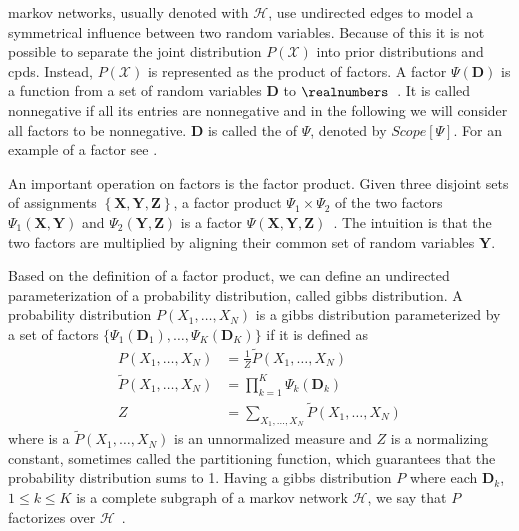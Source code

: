 \bigskip

\Glspl{markov network}, usually denoted with $\mathcal{H}$, use undirected \glspl{edge} to model a symmetrical influence between two \glspl{random variable}.
Because of this it is not possible to separate the \gls{joint distribution} $P(\mathcal{X})$ into \glspl{prior distribution} and \glspl{cpd}.
Instead, $P(\mathcal{X})$ is represented as the product of \glspl{factor}.
A \gls{factor} $\Psi(\mathbf{D})$ is a function from a set of \glspl{random variable} $\mathbf{D}$ to $\realnumbers$~\citep{koller2009probabilistic}.
It is called nonnegative if all its entries are nonnegative and in the following we will consider all factors to be nonnegative.
$\mathbf{D}$ is called the  of $\Psi$, denoted by $Scope[\Psi]$.
For an example of a factor see .

An important operation on factors is the \gls{factor product}.
Given three disjoint sets of assignments $\left\{\mathbf{X}, \mathbf{Y}, \mathbf{Z}\right\}$, a \gls{factor product} $\Psi_1\times \Psi_2$ of the two factors $\Psi_1(\mathbf{X},\mathbf{Y})$ and $\Psi_2(\mathbf{Y},\mathbf{Z})$ is a factor $\Psi(\mathbf{X},\mathbf{Y},\mathbf{Z})$~\citep{koller2009probabilistic}.
The intuition is that the two factors are multiplied by aligning their common set of \glspl{random variable} $\mathbf{Y}$.

Based on the definition of a \gls{factor product}, we can define an undirected parameterization of a \gls{probability distribution}, called \gls{gibbs distribution}.
A \gls{probability distribution} $P(X_1,\dots,X_N)$ is a \gls{gibbs distribution} parameterized by a set of \glspl{factor} $\{\Psi_1(\mathbf{D}_1),\dots,\Psi_K(\mathbf{D}_K)\}$ if it is defined as~\citep{koller2009probabilistic}
\begin{equation}
  \label{equ:gibbs-distribution}
  \begin{split}
  P\left(X_1,\dots,X_N\right) & =\frac{1}{Z}\tilde{P}\left(X_1,\dots,X_N\right) \\
  \tilde{P}\left(X_1,\dots,X_N\right) & =\prod_{k=1}^{K}\Psi_k\left(\mathbf{D}_k\right) \\
  Z & =\sum_{X_1,\ldots,X_N}\tilde{P}\left(X_1,\dots,X_N\right)
  \end{split}
\end{equation}
where is a $\tilde{P}(X_1,\dots,X_N)$ is an unnormalized measure and $Z$ is a normalizing constant, sometimes called the \gls{partitioning function}, which guarantees that the \gls{probability distribution} sums to 1.
Having a \gls{gibbs distribution} $P$ where each $\mathbf{D}_k$, $1\leq k \leq K$ is a complete subgraph of a \gls{markov network} $\mathcal{H}$, we say that $P$ factorizes over $\mathcal{H}$~\citep{koller2009probabilistic}.

